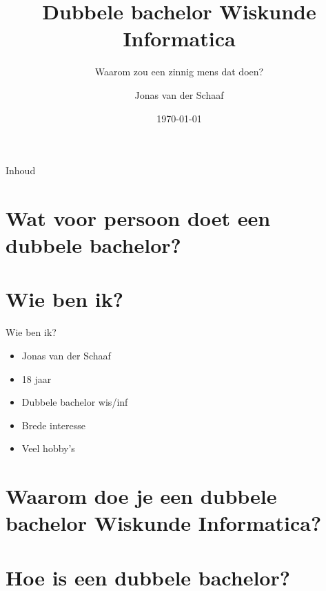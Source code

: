 \documentclass{beamer}
\title{Dubbele bachelor Wiskunde Informatica}
\subtitle{Waarom zou een zinnig mens dat doen?}
\author{Jonas van der Schaaf}
\institute[UvA]{Universiteit van Amsterdam}
\date{\today}
\begin{document}
\begin{frame}
    \maketitle
\end{frame}

\begin{frame}{Inhoud}
    \tableofcontents
\end{frame}

\section{Wat voor persoon doet een dubbele bachelor?}

\section{Wie ben ik?}

\begin{frame}{Wie ben ik?}
    \begin{itemize}
        \setlength\itemsep{1em}
              \pause
        \item Jonas van der Schaaf
              \pause
        \item 18 jaar
              \pause
        \item Dubbele bachelor wis/inf
              \pause
        \item Brede interesse
              \pause
        \item Veel hobby's
    \end{itemize}
\end{frame}

\section{Waarom doe je een dubbele\\ bachelor Wiskunde Informatica?}

\section{Hoe is een dubbele bachelor?}
\end{document}
